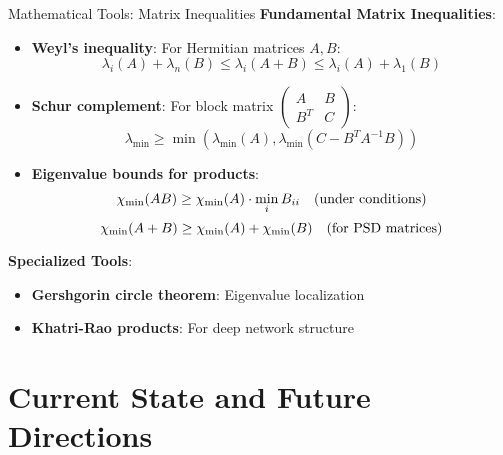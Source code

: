 \begin{frame}{Mathematical Tools: Matrix Inequalities}
  \textbf{Fundamental Matrix Inequalities}:
  \begin{itemize}[<+->]
    \item \textbf{Weyl's inequality}: For Hermitian matrices $A, B$:
    $$\lambda_i(A) + \lambda_n(B) \leq \lambda_i(A + B) \leq \lambda_i(A) + \lambda_1(B)$$
    \item \textbf{Schur complement}: For block matrix $\begin{pmatrix} A & B \\ B^T & C \end{pmatrix}$:
    $$\lambda_{\min} \geq \min(\lambda_{\min}(A), \lambda_{\min}(C - B^T A^{-1} B))$$
    \item \textbf{Eigenvalue bounds for products}:
    $$\chi_{\min}(AB) \geq \chi_{\min}(A) \cdot \min_{i} B_{ii} \quad \text{(under conditions)}$$
    $$\chi_{\min}(A + B) \geq \chi_{\min}(A) + \chi_{\min}(B) \quad \text{(for PSD matrices)}$$
  \end{itemize}
  
  \textbf{Specialized Tools}:
  \begin{itemize}
    \item \textbf{Gershgorin circle theorem}: Eigenvalue localization
    \item \textbf{Khatri-Rao products}: For deep network structure
  \end{itemize}
\end{frame}

\section{Current State and Future Directions}

